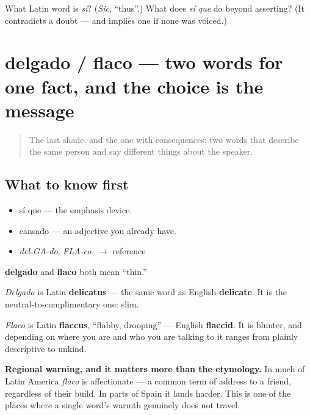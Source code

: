 \begin{tcolorbox}[breakable,colback=teal!4,colframe=teal!35!black,title={Before you move on}]
What Latin word is \emph{sí}? (\emph{Sic}, \textquotedblleft{}thus\textquotedblright{}.) What does \emph{sí que} do beyond asserting? (It contradicts a doubt — and implies one if none was voiced.)
\end{tcolorbox}
\section[delgado / flaco]{delgado / flaco — two words for one fact, and the choice is the message}

\label{lesson:ES-C275-delgado-flaco}



\begin{quote}
The last shade, and the one with consequences: two words that describe the same person and say different things about the speaker.
\end{quote}

\subsection*{What to know first}
\begin{itemize}
\raggedright
  \item sí que — the emphasis device.
  \item cansado — an adjective you already have.
\end{itemize}

\begin{sounds}
\begin{itemize}
\raggedright
  \item \emph{del-GA-do}, \emph{FLA-co}. $\to$ reference
\end{itemize}
\end{sounds}

\begin{cousinweb}
\textbf{delgado} and \textbf{flaco} both mean \textquotedblleft{}thin.\textquotedblright{}

\emph{Delgado} is Latin \textbf{delicatus} — the same word as English \textbf{delicate}. It is the neutral-to-complimentary one: slim.

\emph{Flaco} is Latin \textbf{flaccus}, \textquotedblleft{}flabby, drooping\textquotedblright{} — English \textbf{flaccid}. It is blunter, and depending on where you are and who you are talking to it ranges from plainly descriptive to unkind.

\textbf{Regional warning, and it matters more than the etymology.} In much of Latin America \emph{flaco} is affectionate — a common term of address to a friend, regardless of their build. In parts of Spain it lands harder. This is one of the places where a single word's warmth genuinely does not travel.
\end{cousinweb}

